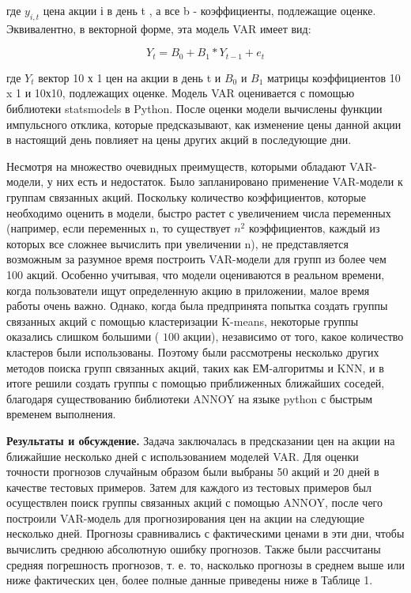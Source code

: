 \begin{multicols}{2}
где \(y_{i,t}\) цена акции і в день t , а все b - коэффициенты,
подлежащие оценке. Эквивалентно, в векторной форме, эта модель VAR имеет
вид:

\begin{equation}
Y_{t} = B_{0} + B_{1} \ast Y_{t - 1} + e_{t}
\end{equation}

где \(Y_{t}\) вектор 10 х 1 цен на акции в день t и \(B_{0}\) и
\(B_{1}\) матрицы коэффициентов 10 x 1 и 10х10, подлежащих оценке.
Модель VAR оценивается с помощью библиотеки statsmodels в Python. После
оценки модели вычислены функции импульсного отклика, которые
предсказывают, как изменение цены данной акции в настоящий день повлияет
на цены других акций в последующие дни.

Несмотря на множество очевидных преимуществ, которыми обладают
VAR-модели, у них есть и недостаток. Было запланировано применение
VAR-модели к группам связанных акций. Поскольку количество
коэффициентов, которые необходимо оценить в модели, быстро растет с
увеличением числа переменных (например, если переменных n, то существует
\(n^{2}\) коэффициентов, каждый из которых все сложнее вычислить при
увеличении n), не представляется возможным за разумное время построить
VAR-модели для групп из более чем 100 акций. Особенно учитывая, что
модели оцениваются в реальном времени, когда пользователи ищут
определенную акцию в приложении, малое время работы очень важно. Однако,
когда была предпринята попытка создать группы связанных акций с помощью
кластеризации K-means, некоторые группы оказались слишком большими (
\(100\) акции), независимо от того, какое количество кластеров были
использованы. Поэтому были рассмотрены несколько других методов поиска
групп связанных акций, таких как ЕМ-алгоритмы и KNN, и в итоге решили
создать группы с помощью приближенных ближайших соседей, благодаря
существованию библиотеки ANNOY на языке python с быстрым временем
выполнения.

{\bfseries Результаты и обсуждение.} Задача заключалась в предсказании цен
на акции на ближайшие несколько дней с использованием моделей VAR. Для
оценки точности прогнозов случайным образом были выбраны 50 акций и 20
дней в качестве тестовых примеров. Затем для каждого из тестовых
примеров был осуществлен поиск группы связанных акций с помощью ANNOY,
после чего построили VAR-модель для прогнозирования цен на акции на
следующие несколько дней. Прогнозы сравнивались с фактическими ценами в
эти дни, чтобы вычислить среднюю абсолютную ошибку прогнозов. Также были
рассчитаны средняя погрешность прогнозов, т. е. то, насколько прогнозы в
среднем выше или ниже фактических цен, более полные данные приведены
ниже в Таблице 1.
\end{multicols}

